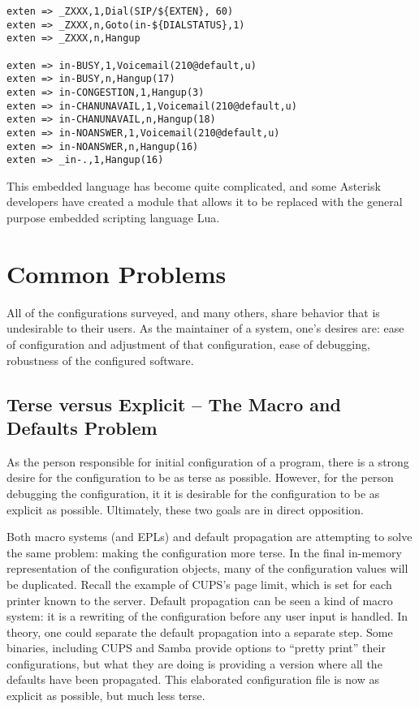 \documentclass[letterpaper,twocolumn,10pt]{article}
\begin{document}
{\scriptsize
\begin{verbatim}
exten => _ZXXX,1,Dial(SIP/${EXTEN}, 60)
exten => _ZXXX,n,Goto(in-${DIALSTATUS},1)
exten => _ZXXX,n,Hangup

exten => in-BUSY,1,Voicemail(210@default,u)
exten => in-BUSY,n,Hangup(17)
exten => in-CONGESTION,1,Hangup(3)
exten => in-CHANUNAVAIL,1,Voicemail(210@default,u)
exten => in-CHANUNAVAIL,n,Hangup(18)
exten => in-NOANSWER,1,Voicemail(210@default,u)
exten => in-NOANSWER,n,Hangup(16)
exten => _in-.,1,Hangup(16)
\end{verbatim}
}

This embedded language has become quite complicated, and some Asterisk developers have created a module that allows it to be replaced with the general purpose embedded scripting language Lua.

\section{Common Problems}
All of the configurations surveyed, and many others, share behavior that is undesirable to their users. As the maintainer of a system, one's desires are: ease of configuration and adjustment of that configuration, ease of debugging, robustness of the configured software.

\subsection{Terse versus Explicit -- The Macro and Defaults Problem}
As the person responsible for initial configuration of a program, there is a strong desire for the configuration to be as terse as possible. However, for the person debugging the configuration, it it is desirable for the configuration to be as explicit as possible. Ultimately, these two goals are in direct opposition.

Both macro systems (and EPLs) and default propagation are attempting to solve the same problem: making the configuration more terse. In the final in-memory representation of the configuration objects, many of the configuration values will be duplicated. Recall the example of CUPS's page limit, which is set for each printer known to the server. Default propagation can be seen a kind of macro system: it is a rewriting of the configuration before any user input is handled. In theory, one could separate the default propagation into a separate step. Some binaries, including CUPS and Samba provide options to ``pretty print'' their configurations, but what they are doing is providing a version where all the defaults have been propagated. This elaborated configuration file is now as explicit as possible, but much less terse.
\end{document}
